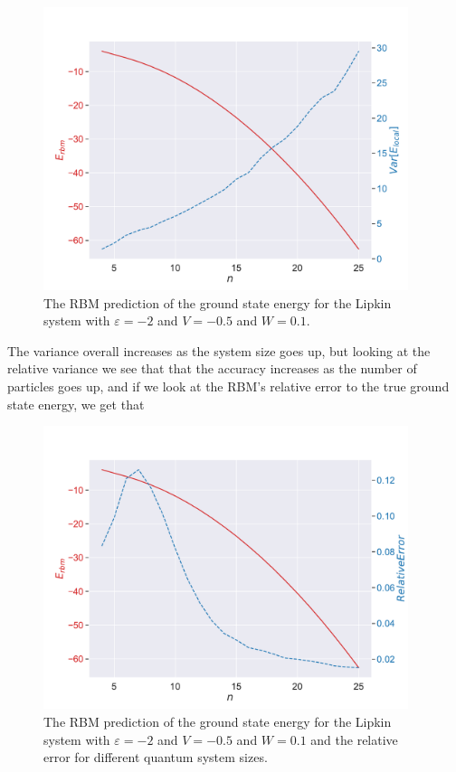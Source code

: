 \begin{figure}[H]
  \begin{center}
    \includegraphics[width=0.95\textwidth]{Figures/Plots/Lipkin/[particles][4-25][e=850][eps=-2][V=-0.5][W=0.1].pdf}
  \end{center}
  \caption{The RBM prediction of the ground state energy for the Lipkin system with $\varepsilon=-2$ and $V=-0.5$ and $W=0.1$.}
\end{figure}

The variance overall increases as the system size goes up, but looking at the relative variance we see that that the accuracy increases as the number of particles goes up, and if we look at the RBM's relative error to the true ground state energy, we get that

\begin{figure}[H]
  \begin{center}
    \includegraphics[width=0.95\textwidth]{Figures/Plots/Lipkin/[particles][4-25][e=850][eps=-2][V=-0.5][W=0.1]error.pdf}
  \end{center}
  \caption{The RBM prediction of the ground state energy for the Lipkin system with $\varepsilon=-2$ and $V=-0.5$ and $W=0.1$ and the relative error for different quantum system sizes.}
\end{figure}

